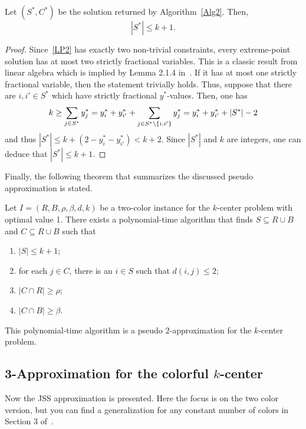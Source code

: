 \begin{theorem}
    \label{size_upb}
    Let $\left(S^*,C^*\right)$ be the solution returned by {Algorithm~\ref{Alg2}}. Then, \[|S^*| \leq k+1.\]
\end{theorem}
%
\begin{proof}
    Since~\ref{LP2} has exactly two non-trivial constraints, every extreme-point solution has at most two strictly fractional variables. This is a classic result from linear algebra which is implied by Lemma 2.1.4 in~\cite{LauRaviSingh2011}. If it has at most one strictly fractional variable, then the statement trivially holds. Thus, suppose that there are $i,i' \in S^*$ which have strictly fractional $y^*$-values. Then, one has
    \[k \geq \sum_{j \in S^*} y^*_j  = y_{i}^* + y_{i'}^* + \sum_{j \in S^* \setminus \left\{i,i'\right\}} y^*_j = y_{i}^* + y_{i'}^* + |S^*| - 2\]
    and thus $|S^*| \leq k + (2 - y_{i}^* - y_{i'}^*) < k + 2$. Since $|S^*|$ and $k$ are integers, one can deduce that $|S^*| \leq k +1$.
\end{proof}

Finally, the following theorem that summarizes the discussed pseudo approximation is stated.

\begin{theorem}
    \label{pseudo_guarantee}
    Let $ I = (R,B,\rho,\beta,d,k)$ be a two-color instance for the $k$-center problem with optimal value 1. There exists a polynomial-time algorithm that finds $S \subseteq R \cup B$ and $C \subseteq R\cup B$ such that
    \begin{enumerate}
        \item $|S| \leq k+1$;
        \item for each $j \in C$, there is an $i \in S$ such that $d(i,j) \leq 2$;
        \item $|C \cap R| \geq \rho$;
        \item $|C \cap B| \geq \beta$.
    \end{enumerate}
    This polynomial-time algorithm is a pseudo $2$-approximation for the $k$-center problem.
\end{theorem}

\subsection{3-Approximation for the colorful $k$-center}
Now the JSS approximation is presented. 
Here the focus is on the two color version, but you can find a generalization for any constant number of colors in Section 3 of~\cite{JSS2020}.

